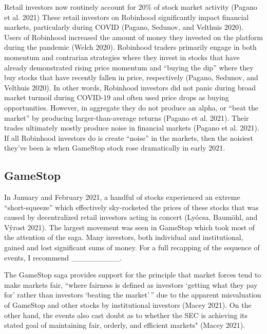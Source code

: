\documentclass[12pt,]{article}
\begin{document}
Retail investors now routinely account for 20\% of stock market activity
(Pagano et al. 2021) These retail investors on Robinhood significantly
impact financial markets, particularly during COVID (Pagano, Sedunov,
and Velthuis 2020). Users of Robinhood increased the amount of money
they invested on the platform during the pandemic (Welch 2020).
Robinhood traders primarily engage in both momentum and contrarian
strategies where they invest in stocks that have already demonstrated
rising price momentum and ``buying the dip'' where they buy stocks that
have recently fallen in price, respectively (Pagano, Sedunov, and
Velthuis 2020). In other words, Robinhood investors did not panic during
broad market turmoil during COVID-19 and often used price drops as
buying opportunities. However, in aggregate they do not produce an
alpha, or ``beat the market'' by producing larger-than-average returns
(Pagano et al. 2021). Their trades ultimately mostly produce noise in
financial markets (Pagano et al. 2021). If all Robinhood investors do is
create ``noise'' in the markets, then the noisiest they've been is when
GameStop stock rose dramatically in early 2021.

\hypertarget{gamestop}{%
\subsection{GameStop}\label{gamestop}}

In January and February 2021, a handful of stocks experienced an extreme
``short-squeeze'' which effectively sky-rocketed the prices of these
stocks that was caused by decentralized retail investors acting in
concert (Lyócsa, Baumöhl, and Vŷrost 2021). The largest movement was
seen in GameStop which took most of the attention of the saga. Many
investors, both individual and institutional, gained and lost
significant sums of money. For a full recapping of the sequence of
events, I recommend \_\_\_\_\_\_\_\_\_.

The GameStop saga provides support for the principle that market forces
tend to make markets fair, ``where fairness is defined as investors
`getting what they pay for' rather than investors `beating the
market'\,'' due to the apparent misvaluation of GameStop and other
stocks by institutional investors (Macey 2021). On the other hand, the
events also cast doubt as to whether the SEC is achieving its stated
goal of maintaining fair, orderly, and efficient markets" (Macey 2021).
\end{document}
